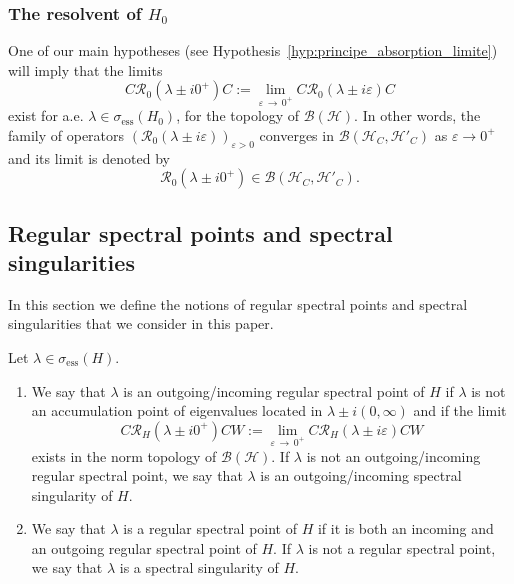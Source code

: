 \documentclass[AHL,Unicode,longabstracts,published]{cedram}
\newcommand{\Hi}{\mathcal{H}}
\newcommand{\ess}{\mathrm{ess}}
\newcommand{\Res}{\mathcal{R}}
\newcommand{\clB}{\mathcal{B}}
\newcommand*{\romanenumi}{\renewcommand*{\theenumi}{\roman{enumi}}}
\newcommand{\Hi}{\mathcal{H}}
\newcommand{\ess}{\mathrm{ess}}
\begin{document}
\subsubsection{The resolvent of \texorpdfstring{$H_0$}{H0}}
One of our main hypotheses (see Hypothesis~\ref{hyp:principe_absorption_limite}) will imply that the limits
\begin{equation}\label{eq:limit_abs_H0}
C\Res_0(\lambda\pm i0^+)C:=\lim_{\varepsilon\,\rightarrow\,0^+}C\Res_0(\lambda\pm i\varepsilon)C
\end{equation}
exist for a.e. $\lambda\in\sigma_{\ess}(H_0)$, for the topology of $\clB(\Hi)$. In other words, the family of operators $(\Res_0(\lambda\pm i\varepsilon))_{\varepsilon>0}$ converges in $\clB(\Hi_C,\Hi'_C)$ as $\varepsilon\to0^+$ and its limit is denoted by
\begin{equation*}
\Res_0\left(\lambda\pm i0^+\right)\in\clB(\Hi_C,\Hi'_C).
\end{equation*}

\subsection{Regular spectral points and spectral singularities}

In this section we define the notions of regular spectral points and spectral singularities that we consider in this paper.

\begin{defi}\label{def:point_spectral_regulier_classique_pour_H}
Let $\lambda\in\sigma_\ess(H)$.
\begin{enumerate}\romanenumi
\item\label{defi2.2.1} We say that $\lambda$ is an outgoing/incoming regular spectral point of $H$ if $\lambda$ is not an accumulation point of eigenvalues located in $\lambda\pm i(0,\infty)$ and if the limit
\begin{equation}\label{eq:def_reg_spec_pt}
C\Res_H(\lambda\pm i0^+)CW:=\lim_{\varepsilon\,\rightarrow\,0^+} C\Res_H(\lambda\pm i\varepsilon)CW
\end{equation}
exists in the norm topology of $\clB(\Hi)$. If $\lambda$ is not an outgoing/incoming regular spectral point, we say that $\lambda$ is an outgoing/incoming spectral singularity of $H$.
\item \label{defi2.2.2}We say that $\lambda$ is a regular spectral point of $H$ if it is both an incoming and an outgoing regular spectral point of $H$. If $\lambda$ is not a regular spectral point, we say that $\lambda$ is a spectral singularity of $H$.
\end{enumerate}
\end{defi}
\end{document}
